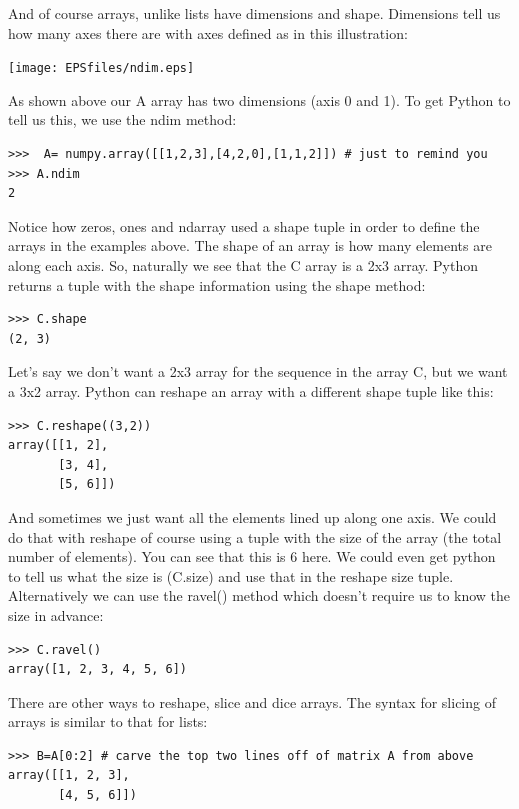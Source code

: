\documentclass[11pt]{book}
\begin{document}
{ And of course  arrays, unlike lists have dimensions and shape.  Dimensions tell us how many axes there are with axes defined as in this illustration:

   \texttt{[image: EPSfiles/ndim.eps]} 
   
   As shown above our {\color{blue}A} array has two dimensions (axis 0 and 1).  To get Python to tell us this, we use the {\color{blue}ndim} method:
   
   { \color{blue} \begin{verbatim}
>>>  A= numpy.array([[1,2,3],[4,2,0],[1,1,2]]) # just to remind you
>>> A.ndim
2
\end{verbatim}}
Notice how {\color{blue}zeros, ones} and {\color{blue}ndarray} used a shape tuple in order to define the arrays in the examples above.   The shape of an array is how many elements are along each axis.  So, naturally we see that the C array is a 2x3 array.  Python returns a tuple with the shape information using the {\color{blue}shape} method:
{ \color{blue} \begin{verbatim}
>>> C.shape
(2, 3)
\end{verbatim}}

Let's say we don't want a 2x3 array for the sequence in the array {\color{blue}C}, but we want a 3x2 array.  Python can reshape an array with a different shape tuple like this:
   { \color{blue} \begin{verbatim}
>>> C.reshape((3,2))
array([[1, 2],
       [3, 4],
       [5, 6]])
\end{verbatim}}

And sometimes we just want all the elements lined up along one axis. We could do that with {\color{blue}reshape} of course using a tuple  with the size of the array (the total number of elements). You  can see that this is 6 here. We could even get python to tell us what the size is ({\color{blue}C.size}) and use that in the reshape size tuple.  Alternatively we can use the {\color{blue}ravel()} method which doesn't require us to know the size in advance:

   { \color{blue} \begin{verbatim}
>>> C.ravel()
array([1, 2, 3, 4, 5, 6])
\end{verbatim}}   

There are other ways to reshape, slice and dice arrays.  
The syntax for slicing of arrays is similar to that for lists:  
{ \color{blue} \begin{verbatim}
>>> B=A[0:2] # carve the top two lines off of matrix A from above
array([[1, 2, 3],
       [4, 5, 6]])
\end{verbatim}}

}
\end{document}
